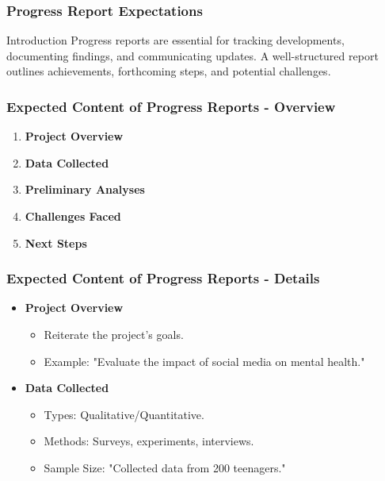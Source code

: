 \documentclass[aspectratio=169]{beamer}
\begin{document}
\begin{frame}[fragile]
    \frametitle{Progress Report Expectations}
    \begin{block}{Introduction}
        Progress reports are essential for tracking developments, documenting findings, and communicating updates. A well-structured report outlines achievements, forthcoming steps, and potential challenges.
    \end{block}
\end{frame}

\begin{frame}[fragile]
    \frametitle{Expected Content of Progress Reports - Overview}
    \begin{enumerate}
        \item \textbf{Project Overview}
        \item \textbf{Data Collected}
        \item \textbf{Preliminary Analyses}
        \item \textbf{Challenges Faced}
        \item \textbf{Next Steps}
    \end{enumerate}
\end{frame}

\begin{frame}[fragile]
    \frametitle{Expected Content of Progress Reports - Details}
    \begin{itemize}
        \item \textbf{Project Overview}
            \begin{itemize}
                \item Reiterate the project’s goals.
                \item Example: "Evaluate the impact of social media on mental health."
            \end{itemize}
        
        \item \textbf{Data Collected}
            \begin{itemize}
                \item Types: Qualitative/Quantitative.
                \item Methods: Surveys, experiments, interviews.
                \item Sample Size: "Collected data from 200 teenagers."
            \end{itemize}
    \end{itemize}
\end{frame}
\end{document}

